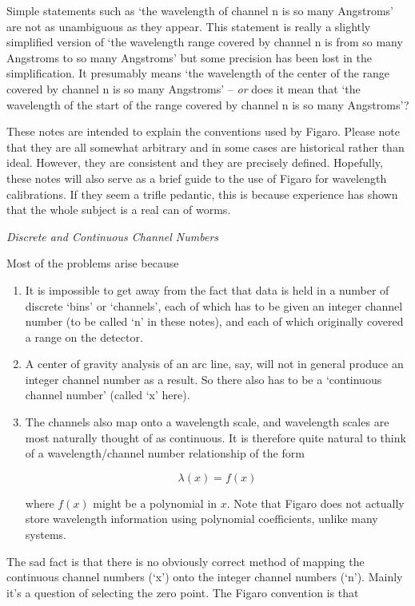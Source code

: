 Simple statements such as `the wavelength of channel n
is so many Angstroms' are not as unambiguous as they
appear.  This statement is really a slightly simplified
version of `the wavelength range covered by channel n is
from so many Angstroms to so many Angstroms' but some
precision has been lost in the simplification.  It presumably 
means `the wavelength of the center of the range
covered by channel n is so many Angstroms' -- {\it or} does it
mean that `the wavelength of the start of the range
covered by channel n is so many Angstroms'?

These notes are intended to explain the conventions used
by Figaro. Please note that they are all somewhat arbitrary
and in some cases are historical rather than ideal.
However, they are consistent and they are precisely defined.
Hopefully, these notes will also serve as a brief guide to
the use of Figaro for wavelength calibrations.  If they
seem a trifle pedantic, this is because experience has
shown that the whole subject is a real can of worms.


\goodbreak
\vspace{12pt}
{\it Discrete and Continuous Channel Numbers}

Most of the problems arise because

\begin{enumerate}
\item It is impossible to get away from the fact that data is held in a
   number of discrete `bins' or `channels', each of which has to be
   given an integer channel number (to be called `n' in these notes),
   and each of which originally covered a range on the detector.
\item A center of gravity analysis of an arc line, say, will not in
   general produce an integer channel number as a result.  So there also
   has to be a `continuous channel number' (called `x' here).
\item The channels also map onto a wavelength scale, and wavelength
   scales are most naturally thought of as continuous.  It is therefore
   quite natural to think of a wavelength/channel number relationship of
   the form

   $$\lambda(x) = f(x)$$

   where $f(x)$ might be a polynomial in $x$.  Note that Figaro does not
   actually store wavelength information using polynomial coefficients,
   unlike many systems.
\end{enumerate}

The sad fact is that there is no obviously correct
method of mapping the continuous channel numbers (`x')
onto the integer channel numbers (`n').  Mainly it's a
question of selecting the zero point.  The Figaro
convention is that

